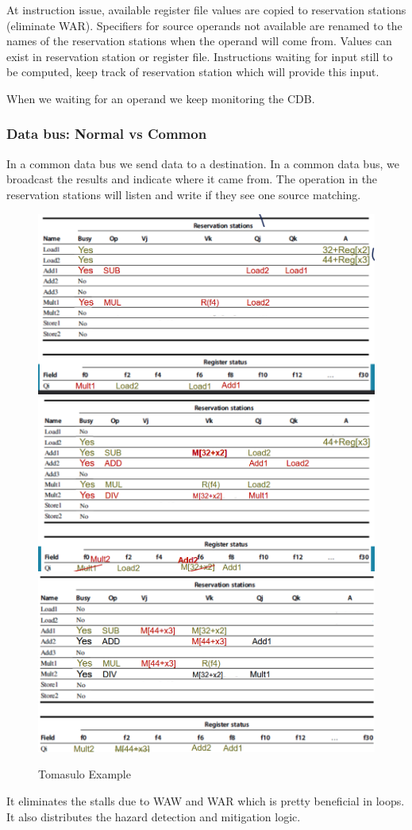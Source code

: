 \documentclass{report}
\begin{document}
At instruction issue, available register file values are copied to reservation stations (eliminate WAR). Specifiers for source operands not available are renamed to the names of the reservation stations when the operand will come from. Values can exist in reservation station or register file. Instructions waiting for input still to be computed, keep track of reservation station which will provide this input.

When we waiting for an operand we keep monitoring the CDB.


\subsubsection{Data bus: Normal vs Common}

In a common data bus we send data to a destination. In a common data bus, we broadcast the results and indicate where it came from. The operation in the reservation stations will listen and write if they see one source matching.

\begin{figure}[H]
    \centering
    \includegraphics[width=0.45\linewidth]{tomasulo_ex1.png}
    \includegraphics[width=0.45\linewidth]{tomasulo_ex2.png}
    \includegraphics[width=0.45\linewidth]{tomasulo_ex3.png}
    \caption{Tomasulo Example}
    \label{fig:tomasulo-example-label}
\end{figure}

It eliminates the stalls due to WAW and WAR which is pretty beneficial in loops. It also distributes the hazard detection and mitigation logic.
\end{document}
